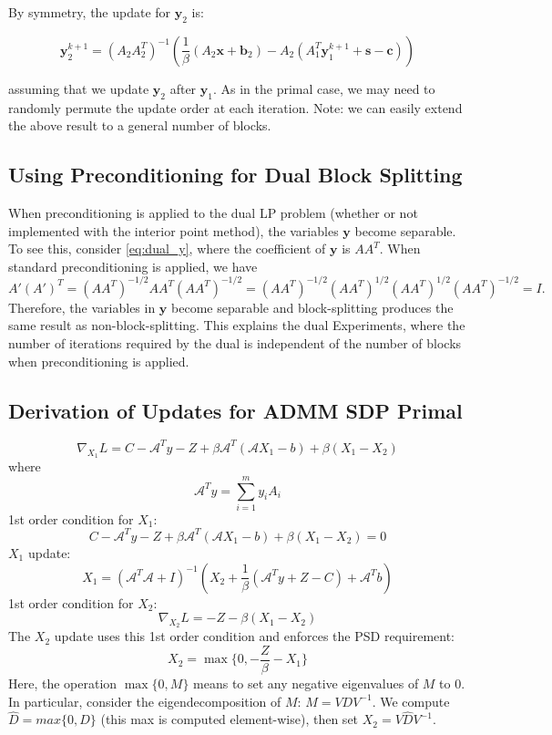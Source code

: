 \documentclass{article}
\begin{document}
By symmetry, the update for $\mathbf{y}_{2}$ is:

\[
\mathbf{y}_{2}^{k+1}=\left(A_{2}A_{2}^{T}\right)^{-1}\left(\frac{1}{\beta}\left(A_{2}\mathbf{x}+\mathbf{b}_{2}\right)-A_{2}\left(A_{1}^{T}\mathbf{y}_{1}^{k+1}+\mathbf{s}-\mathbf{c}\right)\right)
\]


assuming that we update $\mathbf{y}_{2}$ after $\mathbf{y}_{1}$. As in the primal case, we may need to randomly permute the update order at each iteration.
Note: we can easily extend the above result to a general number of blocks. 


{ \subsection*{Using Preconditioning for Dual Block Splitting}
When preconditioning is applied to the dual LP problem (whether or not implemented with the interior point method), the variables $\mathbf{y}$ become separable. To see this, consider \eqref{eq:dual_y}, where the coefficient of $\mathbf{y}$ is $A A^T$. When standard preconditioning is applied, we have
\[
A' (A')^T  = (AA^T )^{-1/2}A A^T (AA^T )^{-1/2} =  (AA^T )^{-1/2}(AA^T )^{1/2} (AA^T )^{1/2} (AA^T )^{-1/2}  = I.
\]
Therefore, the variables in $\mathbf{y}$ become separable and block-splitting produces the same result as non-block-splitting. This explains the dual Experiments, where the number of iterations required by the dual is independent of the number of blocks when preconditioning is applied.


\subsection*{Derivation of Updates for ADMM SDP Primal}
\[
\nabla_{X_{1}}L=C-\mathcal{A}^{T}y-Z+\beta\mathcal{A}^{T}\left(\mathcal{A}X_{1}-b\right)+\beta\left(X_{1}-X_{2}\right)
\]
where 
\[
\mathcal{A}^{T}y=\sum_{i=1}^{m}y_{i}A_{i}
\]
1st order condition for $X_{1}$:
\[
C-\mathcal{A}^{T}y-Z+\beta\mathcal{A}^{T}\left(\mathcal{A}X_{1}-b\right)+\beta\left(X_{1}-X_{2}\right)=0
\]
$X_{1}$ update:
\[
X_{1}=\left(\mathcal{A}^{T}\mathcal{A}+I\right)^{-1}\left(X_{2}+\frac{1}{\beta}\left(\mathcal{A}^{T}y+Z-C\right)+\mathcal{A}^{T}b\right)
\]
1st order condition for $X_{2}$:
\[
\nabla_{X_{2}}L=-Z-\beta\left(X_{1}-X_{2}\right)
\]
The $X_{2}$ update uses this 1st order condition and enforces the
PSD requirement:
\[
X_{2} = \max\{0,-\frac{Z}{\beta}-X_{1}\}
\]
Here, the operation $\max\{0,M\}$ means to set any negative eigenvalues
of $M$ to 0. In particular, consider the eigendecomposition of $M$:
$M=VDV^{-1}$. We compute $\hat{D}=max\{0,D\}$ (this max is computed
element-wise), then set $X_{2}=V\hat{D}V^{-1}$.


}
\end{document}
